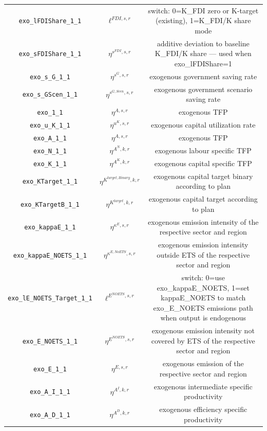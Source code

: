 \begin{center}
\begin{longtable}{ccc}
\texttt{exo\_lFDIShare\_1\_1} & ${\ell^{FDI,s,r}}$ & switch: 0=K\_FDI zero or K-target (existing), 1=K\_FDI/K share mode\\
\texttt{exo\_sFDIShare\_1\_1} & ${\eta^{s^{FDI},s,r}}$ & additive deviation to baseline K\_FDI/K share — used when exo\_lFDIShare=1\\
\texttt{exo\_s\_G\_1\_1} & ${\eta^{s^G,s,r}}$ & exogenous government saving rate\\
\texttt{exo\_s\_GScen\_1\_1} & ${\eta^{s^{G,Scen},s,r}}$ & exogenous government scenario saving rate\\
\texttt{exo\_1\_1} & ${\eta^{A,s,r}}$ & exogenous TFP\\
\texttt{exo\_u\_K\_1\_1} & ${\eta^{u^K,s,r}}$ & exogenous capital utilization rate\\
\texttt{exo\_A\_1\_1} & ${\eta^{A,s,r}}$ & exogenous TFP\\
\texttt{exo\_N\_1\_1} & ${\eta^{A^{N},k,r}}$ & exogenous labour specific TFP\\
\texttt{exo\_K\_1\_1} & ${\eta^{A^{K},k,r}}$ & exogenous capital specific TFP\\
\texttt{exo\_KTarget\_1\_1} & ${\eta^{K^{target,Binary},k,r}}$ & exogenous capital target binary according to plan\\
\texttt{exo\_KTargetB\_1\_1} & ${\eta^{K^{target},k,r}}$ & exogenous capital target according to plan\\
\texttt{exo\_kappaE\_1\_1} & ${\eta^{\kappa^{E},s,r}}$ & exogenous emission intensity of the respective sector and region\\
\texttt{exo\_kappaE\_NOETS\_1\_1} & ${\eta^{\kappa^{E,No ETS},s,r}}$ & exogenous emission intensity outside ETS of the respective sector and region\\
\texttt{exo\_lE\_NOETS\_Target\_1\_1} & ${\ell^{E^{NOETS},s,r}}$ & switch: 0=use exo\_kappaE\_NOETS, 1=set kappaE\_NOETS to match exo\_E\_NOETS emissions path when output is endogenous\\
\texttt{exo\_E\_NOETS\_1\_1} & ${\eta^{E^{NOETS},s,r}}$ & exogenous emission intensity not covered by ETS of the respective sector and region\\
\texttt{exo\_E\_1\_1} & ${\eta^{E,s,r}}$ & exogenous emission of the respective sector and region\\
\texttt{exo\_A\_I\_1\_1} & ${\eta^{A^{I},k,r}}$ & exogenous intermediate specific productivity\\
\texttt{exo\_A\_D\_1\_1} & ${\eta^{A^{D},k,r}}$ & exogenous efficiency specific productivity\\

\end{longtable}
\end{center}
